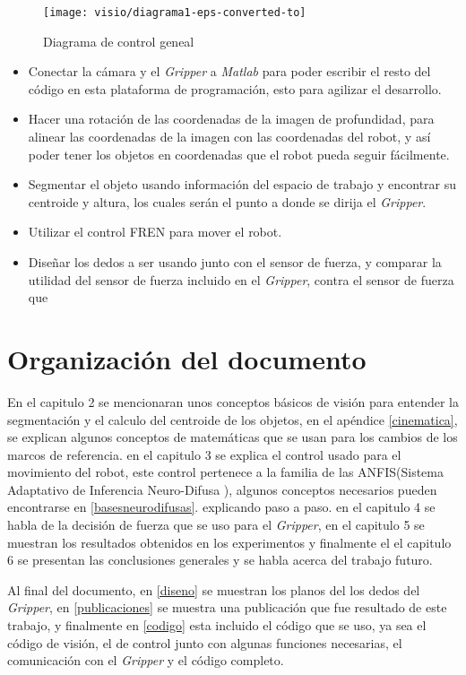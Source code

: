 \begin{figure}[h]
	\centering
	\texttt{[image: visio/diagrama1-eps-converted-to]}
	\caption{Diagrama de control geneal}
	\label{fig:diagrama1-eps-converted-to}
\end{figure}
\begin{itemize}

\item Conectar la cámara y el \textit{Gripper} a \textit{Matlab} para poder escribir el resto del código en esta plataforma de programación, esto para agilizar el desarrollo.

\item Hacer una rotación de las coordenadas de la imagen de profundidad, para alinear las coordenadas de la imagen con las coordenadas del robot, y así poder tener los objetos en coordenadas que el robot pueda seguir fácilmente.

\item Segmentar el objeto usando información del espacio de trabajo y encontrar su centroide y altura, los cuales serán el punto a donde se dirija el \textit{Gripper}.

\item Utilizar el control FREN para mover el robot.

\item Diseñar los dedos a ser usando junto con el sensor de fuerza, y comparar la utilidad del sensor de fuerza incluido en el \textit{Gripper}, contra el sensor de fuerza que 
\end{itemize}

\section{Organización del documento}


En el capitulo 2 se mencionaran unos conceptos básicos de visión para entender la segmentación y el calculo del centroide de los objetos, en el apéndice \cref{cinematica}, se explican algunos conceptos de matemáticas que se usan para los cambios de los marcos de referencia. en el capitulo 3 se explica el control usado para el movimiento del robot, este control pertenece a la familia de las ANFIS(Sistema Adaptativo de Inferencia Neuro-Difusa ), algunos conceptos necesarios pueden encontrarse en \cref{basesneurodifusas}. explicando paso a paso. en el capitulo 4 se habla de la decisión de fuerza que se uso para el \textit{Gripper}, 
en el capitulo 5 se muestran los resultados obtenidos en los experimentos y finalmente el el capitulo 6 se presentan las conclusiones generales y se habla acerca del trabajo futuro.

Al final del documento, en \cref{diseno} se muestran los planos del los dedos del \textit{Gripper}, en \cref{publicaciones} se muestra una publicación que fue resultado de este trabajo, y finalmente en \cref{codigo} esta incluido el código que se uso, ya sea el código de visión, el de control junto con algunas funciones necesarias, el comunicación con el \textit{Gripper} y el código completo.

